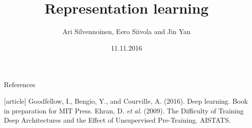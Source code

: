 \documentclass[first=purple,second=blue,logo=blueque]{./misc/aaltoslides}
\title{Representation learning}
\institute[~]{Aalto deep learning course}
\author[~]{Ari Silvennoinen, Eero Siivola and Jin Yan}
\date{11.11.2016}
\begin{document}
\aaltotitleframe




\begin{frame}{References}
\begin{thebibliography}{9}
[article]
Goodfellow, I., Bengio, Y., and Courville, A. (2016). Deep learning. Book in preparation for MIT Press.
 Ehran, D. \textit{et al}. (2009). The Difficulty of Training Deep Architectures and the Effect of Unsupervised Pre-Training. AISTATS.
\end{thebibliography}
\end{frame}
\end{document}
